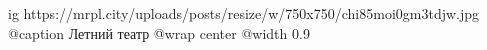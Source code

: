  
 
 
 
 

\ifcmt
  ig https://mrpl.city/uploads/posts/resize/w/750x750/chi85moi0gm3tdjw.jpg
	@caption Летний театр
  @wrap center
  @width 0.9
\fi
